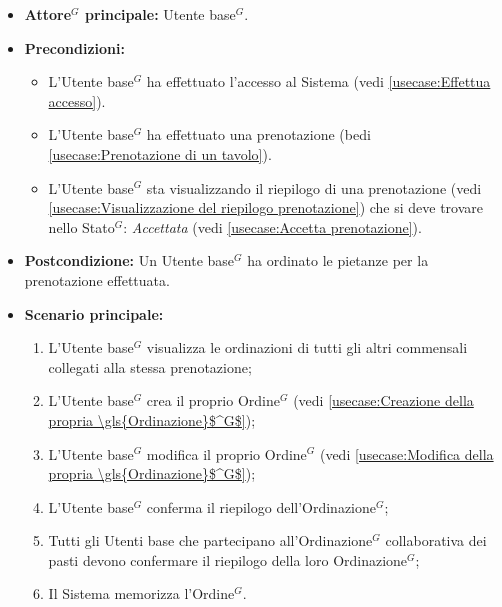 \label{usecase:Creazione dell'\gls{Ordinazione}$^G$ collaborativa dei pasti}
\begin{itemize}
	\item \textbf{\gls{Attore}$^G$ principale:} \gls{Utente base}$^G$.

	\item \textbf{Precondizioni:}
	      \begin{itemize}
		      \item L'\gls{Utente base}$^G$ ha effettuato l'accesso al Sistema (vedi \autoref{usecase:Effettua accesso}).
		      \item L'\gls{Utente base}$^G$ ha effettuato una prenotazione (bedi \autoref{usecase:Prenotazione di un tavolo}).
		      \item L'\gls{Utente base}$^G$ sta visualizzando il riepilogo di una prenotazione (vedi \autoref{usecase:Visualizzazione del riepilogo prenotazione}) che si deve trovare nello \gls{Stato}$^G$: \textit{Accettata}  (vedi \autoref{usecase:Accetta prenotazione}).
	      \end{itemize}

	\item \textbf{Postcondizione:} Un \gls{Utente base}$^G$ ha ordinato le pietanze per la prenotazione effettuata.

	\item \textbf{Scenario principale:}
	      \begin{enumerate}
		      \item L'\gls{Utente base}$^G$ visualizza le ordinazioni di tutti gli altri commensali collegati alla stessa prenotazione;
		      \item L'\gls{Utente base}$^G$ crea il proprio \gls{Ordine}$^G$ (vedi \autoref{usecase:Creazione della propria \gls{Ordinazione}$^G$});
		      \item L'\gls{Utente base}$^G$ modifica il proprio \gls{Ordine}$^G$ (vedi \autoref{usecase:Modifica della propria \gls{Ordinazione}$^G$});

		      \item L'\gls{Utente base}$^G$ conferma il riepilogo dell'\gls{Ordinazione}$^G$;

		      \item Tutti gli Utenti base che partecipano all'\gls{Ordinazione}$^G$ collaborativa dei pasti devono
		            confermare il riepilogo della loro \gls{Ordinazione}$^G$;
		      \item Il Sistema memorizza l'\gls{Ordine}$^G$.
	      \end{enumerate}


\end{itemize}
